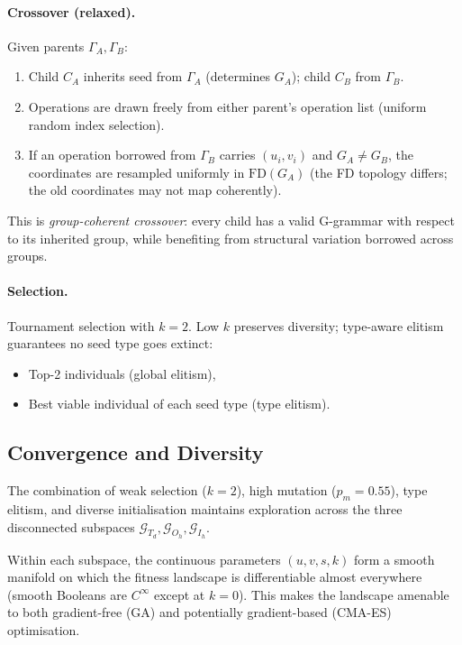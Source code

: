 \documentclass[11pt, a4paper]{article}
\newcommand{\FD}{\mathrm{FD}}
\newcommand{\Td}{T_d}
\newcommand{\Oh}{O_h}
\newcommand{\Ih}{I_h}
\begin{document}
\paragraph{Crossover (relaxed).}
Given parents $\Gamma_A, \Gamma_B$:
\begin{enumerate}
  \item Child $C_A$ inherits seed from $\Gamma_A$ (determines $G_A$); child $C_B$ from $\Gamma_B$.
  \item Operations are drawn freely from either parent's operation list (uniform random index selection).
  \item If an operation borrowed from $\Gamma_B$ carries $(u_i, v_i)$ and $G_A \neq G_B$, the coordinates are resampled uniformly in $\FD(G_A)$ (the FD topology differs; the old coordinates may not map coherently).
\end{enumerate}
This is \emph{group-coherent crossover}: every child has a valid G-grammar
with respect to its inherited group, while benefiting from structural
variation borrowed across groups.

\paragraph{Selection.}
Tournament selection with $k=2$. Low $k$ preserves diversity; type-aware
elitism guarantees no seed type goes extinct:
\begin{itemize}
  \item Top-2 individuals (global elitism),
  \item Best viable individual of each seed type (type elitism).
\end{itemize}

\subsection{Convergence and Diversity}

The combination of weak selection ($k=2$), high mutation ($p_m = 0.55$), type
elitism, and diverse initialisation maintains exploration across the three
disconnected subspaces $\mathcal{G}_{\Td}, \mathcal{G}_{\Oh}, \mathcal{G}_{\Ih}$.

Within each subspace, the continuous parameters $(u,v,s,k)$ form a smooth
manifold on which the fitness landscape is differentiable almost everywhere
(smooth Booleans are $C^\infty$ except at $k=0$). This makes the landscape
amenable to both gradient-free (GA) and potentially gradient-based (CMA-ES)
optimisation.
\end{document}
